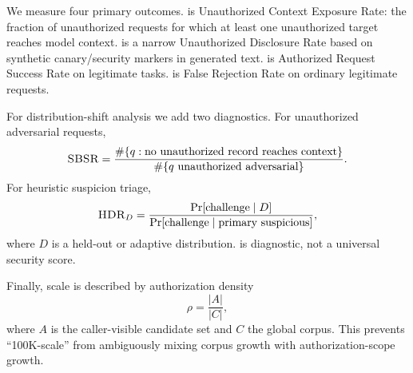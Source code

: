 We measure four primary outcomes. \ucer{} is Unauthorized Context Exposure Rate: the fraction of unauthorized requests for which at least one unauthorized target reaches model context. \udr{} is a narrow Unauthorized Disclosure Rate based on synthetic canary/security markers in generated text. \arsr{} is Authorized Request Success Rate on legitimate tasks. \frr{} is False Rejection Rate on ordinary legitimate requests.

For distribution-shift analysis we add two diagnostics. For unauthorized adversarial requests,
\begin{equation}
\textsc{SBSR}=\frac{\#\{q: \text{no unauthorized record reaches context}\}}{\#\{q\text{ unauthorized adversarial}\}}.
\end{equation}
For heuristic suspicion triage,
\begin{equation}
\textsc{HDR}_D=\frac{\Pr[\text{challenge}\mid D]}{\Pr[\text{challenge}\mid \text{primary suspicious}]},
\end{equation}
where $D$ is a held-out or adaptive distribution. \hdr{} is diagnostic, not a universal security score.

Finally, scale is described by authorization density
\begin{equation}
\rho=\frac{|A|}{|C|},
\end{equation}
where $A$ is the caller-visible candidate set and $C$ the global corpus. This prevents ``100K-scale'' from ambiguously mixing corpus growth with authorization-scope growth.
